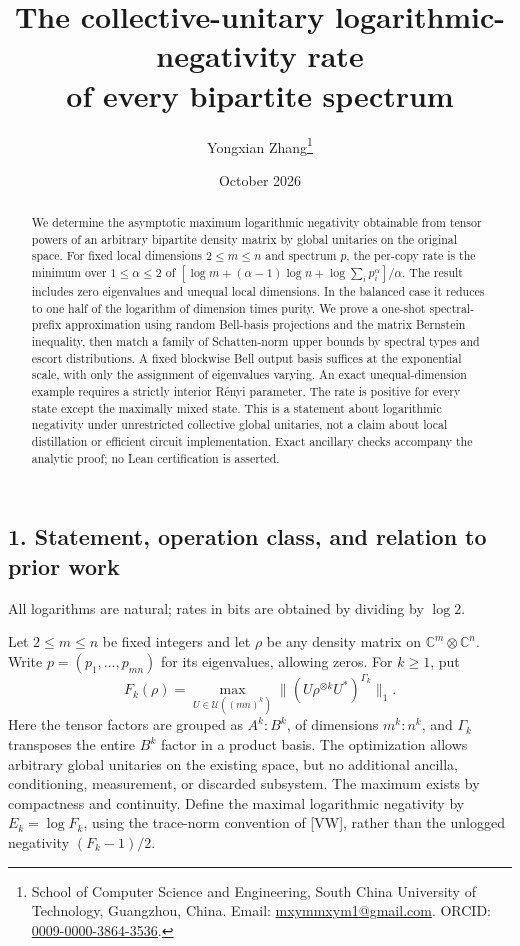 \documentclass[11pt]{article}
\title{The collective-unitary logarithmic-negativity rate\\of every bipartite spectrum}
\author{Yongxian Zhang\thanks{School of Computer Science and Engineering, South China University of Technology, Guangzhou, China. Email: \href{mailto:mxymmxym1@gmail.com}{mxymmxym1@gmail.com}. ORCID: \href{https://orcid.org/0009-0000-3864-3536}{0009-0000-3864-3536}.}}
\date{October 2026}
\begin{document}
\maketitle
\begin{abstract}
We determine the asymptotic maximum logarithmic negativity obtainable from tensor powers of an arbitrary bipartite density matrix by global unitaries on the original space. For fixed local dimensions $2\le m\le n$ and spectrum $p$, the per-copy rate is the minimum over $1\le\alpha\le2$ of
$[\log m+(\alpha-1)\log n+\log\sum_i p_i^\alpha]/\alpha$.
The result includes zero eigenvalues and unequal local dimensions. In the balanced case it reduces to one half of the logarithm of dimension times purity. We prove a one-shot spectral-prefix approximation using random Bell-basis projections and the matrix Bernstein inequality, then match a family of Schatten-norm upper bounds by spectral types and escort distributions. A fixed blockwise Bell output basis suffices at the exponential scale, with only the assignment of eigenvalues varying. An exact unequal-dimension example requires a strictly interior R\'enyi parameter. The rate is positive for every state except the maximally mixed state. This is a statement about logarithmic negativity under unrestricted collective global unitaries, not a claim about local distillation or efficient circuit implementation. Exact ancillary checks accompany the analytic proof; no Lean certification is asserted.
\end{abstract}

\hypertarget{statement-operation-class-and-relation-to-prior-work}{%
\subsection{1. Statement, operation class, and relation to prior work}\label{statement-operation-class-and-relation-to-prior-work}}

All logarithms are natural; rates in bits are obtained by dividing by \(\log2\).

Let \(2\le m\le n\) be fixed integers and let \(\rho\) be any density matrix on \(\mathbb C^m\otimes\mathbb C^n\). Write \(p=(p_1,\ldots,p_{mn})\) for its eigenvalues, allowing zeros. For \(k\ge1\), put \[
 F_k(\rho)=\max_{U\in\mathcal U((mn)^k)}
 \big\|(U\rho^{\otimes k}U^*)^{\Gamma_k}\big\|_1.
 \tag{1}
\] Here the tensor factors are grouped as \(A^k:B^k\), of dimensions \(m^k:n^k\), and \(\Gamma_k\) transposes the entire \(B^k\) factor in a product basis. The optimization allows arbitrary global unitaries on the existing space, but no additional ancilla, conditioning, measurement, or discarded subsystem. The maximum exists by compactness and continuity. Define the maximal logarithmic negativity by \(E_k=\log F_k\), using the trace-norm convention of {[}VW{]}, rather than the unlogged negativity \((F_k-1)/2\).
\end{document}
